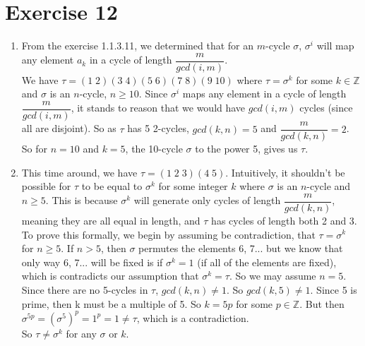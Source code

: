 \documentclass[12pt]{article}
\newcommand{\Z}{\mathbb{Z}}
\begin{document}
    \section*{Exercise 12}
    \begin{enumerate}[label=\textbf{\alph*.}]
        \item 
            From the exercise 1.1.3.11, we determined that for an
            $m$-cycle $\sigma$, $\sigma^i$ will map any element $a_k$ 
            in a cycle of length $\dfrac{m}{gcd(i, m)}$. \\
            We have $\tau = (1\;2)(3\;4)(5\;6)(7\;8)(9\;10)$
            where $\tau = \sigma^k$ for some $k \in \Z$
            and $\sigma$ is an $n$-cycle, $n \geqslant 10$.
            Since $\sigma^i$ maps any element in a cycle of length
            $\dfrac{m}{gcd(i, m)}$,
            it stands to reason that we would have $gcd(i, m)$ cycles
            (since all are disjoint).
            So as $\tau$ has 5 2-cycles, $gcd(k, n) = 5$
            and $\dfrac{m}{gcd(k, n)} = 2$. So for $n = 10$ and $k = 5$,
            the 10-cycle $\sigma$ to the power 5, gives us $\tau$.
        \item
            This time around, we have $\tau = (1\;2\;3)(4\;5)$.
            Intuitively, it shouldn't be possible for $\tau$ to be
            equal to $\sigma^k$ for some integer $k$
            where $\sigma$ is an $n$-cycle and $n \geqslant 5$.
            This is because $\sigma^k$
            will generate only cycles of length $\dfrac{m}{gcd(k, n)}$,
            meaning they are all equal in length,
            and $\tau$ has cycles of length both 2 and 3.
            To prove this formally, 
            we begin by assuming be contradiction, that $\tau = \sigma^k$
            for $n \geqslant 5$.
            If $n > 5$, then $\sigma$ permutes the elements 6, 7...
            but we know that only way 6, 7... will be fixed is
            if $\sigma^k = 1$ (if all of the elements are fixed),
            which is contradicts our assumption that $\sigma^k = \tau$.
            So we may assume $n = 5$.
            Since there are no 5-cycles in $\tau$,
            $gcd(k, n) \neq 1$. So $gcd(k, 5) \neq 1$.
            Since 5 is prime, then k must be a multiple of 5.
            So $k = 5p$ for some $p \in \Z$.
            But then $\sigma^{5p} = (\sigma^5)^p = 1^p = 1 \neq \tau$,
            which is a contradiction. \\
            So $\tau \neq \sigma^k$ for any $\sigma$ or $k$.
    \end{enumerate}
\end{document}
